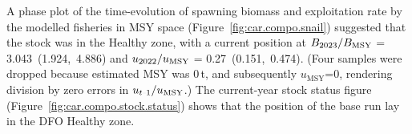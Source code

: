 \documentclass[11pt]{book}
\newcommand{\Bmsy}{B_\text{MSY}}
\newcommand{\umsy}{u_\text{MSY}}
\def\minus{%
  \setbox0=\hbox{-}%
  \vcenter{%
    \hrule width\wd0 height 0.05pt%
  }%
}
\begin{document}
A phase plot of the time-evolution of spawning biomass and exploitation rate by the modelled fisheries in MSY space (Figure~\ref{fig:car.compo.snail}) suggested that the stock was in the Healthy zone, with a current position at $B_{\currYear}/\Bmsy$ = 3.043~(1.924,~4.886)
and $u_{\prevYear}/\umsy$ = 0.27~(0.151,~0.474).
(Four samples were dropped because estimated MSY was 0\,t, and subsequently $\umsy$=0, rendering division by zero errors in $u_{t\minus1}/\umsy$.)
The current-year stock status figure (Figure~\ref{fig:car.compo.stock.status}) shows that the position of the base run lay in the DFO Healthy zone.


\end{document}

